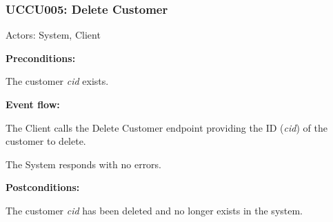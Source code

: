 \begin{ucbox}{\subsubsection{UCCU005: Delete Customer}}
\label{UCCU005}

Actors: System, Client

\textbf{Preconditions:}

\ucitem The customer \textit{cid} exists.

\textbf{Event flow:}

\ucitem The Client calls the Delete Customer endpoint providing the ID (\textit{cid}) of the customer to delete.

\ucitem The System responds with no errors.

\textbf{Postconditions:}

\ucitem The customer \textit{cid} has been deleted and no longer exists in the system.

\end{ucbox}
\newpage
